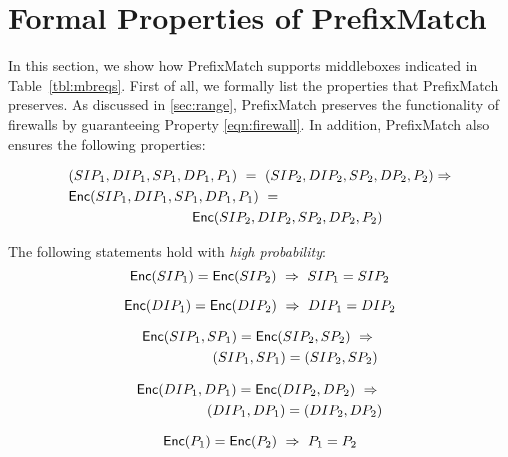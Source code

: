 \section{Formal Properties of PrefixMatch}

In this section, we show how PrefixMatch supports middleboxes indicated in Table~\ref{tbl:mbreqs}.
First of all, we formally list the properties that PrefixMatch preserves. As discussed in \ref{sec:range},
PrefixMatch preserves the functionality of firewalls by guaranteeing Property \ref{eqn:firewall}. In addition,
PrefixMatch also ensures the following properties:

\begin{equation}
\label{eqn:pm1}
\begin{split}
& (SIP_1, DIP_1, SP_1, DP_1, P_1)\ =\ (SIP_2, DIP_2, SP_2, DP_2, P_2) \Rightarrow \\
& \Enc(SIP_1, DIP_1, SP_1, DP_1, P_1)\ = \\ 
& \hspace{3cm} \ \Enc(SIP_2, DIP_2, SP_2, DP_2, P_2)
\end{split}
\end{equation}

The following statements hold with {\em high probability}:
\begin{equation}
\label{eqn:pm2}
\mathsf{Enc}(SIP_1) = \mathsf{Enc}(SIP_2)\ \Rightarrow\ SIP_1 = SIP_2
\end{equation}


\begin{equation}
\label{eqn:pm3}
\mathsf{Enc}(DIP_1) = \mathsf{Enc}(DIP_2)\ \Rightarrow\ DIP_1 = DIP_2
\end{equation}

\begin{equation}
\begin{split}
\label{eqn:pm4}
\mathsf{Enc}(SIP_1, SP_1) = \mathsf{Enc}(SIP_2, SP_2)\ \Rightarrow\ \\
(SIP_1, SP_1) = (SIP_2, SP_2)
\end{split}
\end{equation}

\begin{equation}
\begin{split}
\label{eqn:pm5}
\mathsf{Enc}(DIP_1, DP_1) = \mathsf{Enc}(DIP_2, DP_2)\ \Rightarrow\ \\
(DIP_1, DP_1) = (DIP_2, DP_2)
\end{split}
\end{equation}

\begin{equation}
\label{eqn:pm6}
\mathsf{Enc}(P_1) = \mathsf{Enc}(P_2)\ \Rightarrow\ P_1 = P_2
\end{equation}

